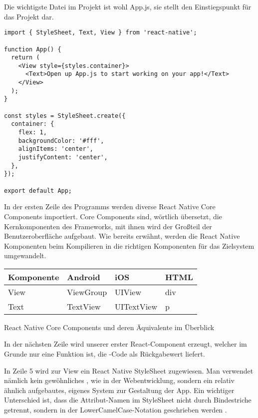 Die wichtigste Datei im Projekt ist wohl App.js, sie stellt den Einstiegspunkt für das Projekt dar.

\begin{lstlisting}
import { StyleSheet, Text, View } from 'react-native';

function App() {
  return (
    <View style={styles.container}>
      <Text>Open up App.js to start working on your app!</Text>
    </View>
  );
}

const styles = StyleSheet.create({
  container: {
    flex: 1,
    backgroundColor: '#fff',
    alignItems: 'center',
    justifyContent: 'center',
  },
});

export default App;
\end{lstlisting}

In der ersten Zeile des Programms werden diverse React Native Core Components importiert. Core
Components sind, wörtlich übersetzt, die Kernkomponenten des Frameworks, mit ihnen wird der Großteil
der Benutzeroberfläche aufgebaut. Wie bereits erwähnt, werden die React Native Komponenten beim
Kompilieren in die richtigen Komponenten für das Zielsystem umgewandelt.

\begin{table}[H]
\centering
\begin{tabular}{|l|l|l|l|}
  \hline
  \textbf{Komponente} & \textbf{Android} & \textbf{iOS} & \textbf{HTML} \\ \hline\hline
  View                & ViewGroup        & UIView       & div          \\
  Text                & TextView         & UITextView   & p            \\ \hline
\end{tabular}
\end{table}

\begin{center}
  React Native Core Components und deren Äquivalente im Überblick \cite{reactNativeCoreComponents}
\end{center}

In der nächsten Zeile wird unserer erster React-Component erzeugt, welcher im Grunde nur eine
Funktion ist, die -Code als Rückgabewert liefert.

In Zeile 5 wird zur View ein React Native StyleSheet zugewiesen. Man verwendet nämlich kein
gewöhnliches , wie in der Webentwicklung, sondern ein relativ ähnlich aufgebautes,
eigenes System zur Gestaltung der App. Ein wichtiger Unterschied ist, dass die Attribut-Namen im
StyleSheet nicht durch Bindestriche getrennt, sondern in der LowerCamelCase-Notation geschrieben
werden \cite{camelCaseNotation}.

